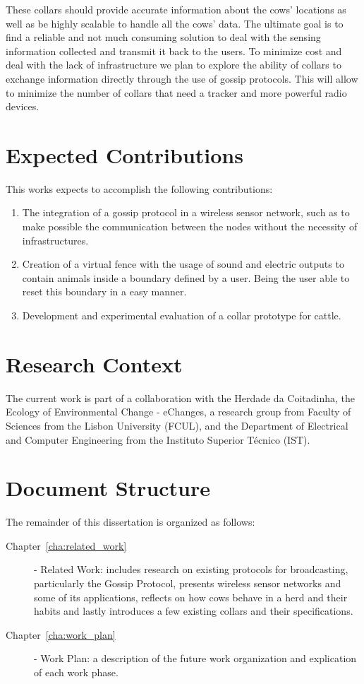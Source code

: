 These collars should provide accurate information about the cows' locations as well as be
highly scalable to handle all the cows' data. The ultimate goal is to find a reliable and
not much consuming solution to deal with the sensing information collected and transmit it
back to the users. To minimize cost and deal with the lack of infrastructure we plan to explore
the ability of collars to exchange information directly through the use of gossip protocols.
This will allow to minimize the number of collars that need a  tracker and
more powerful radio devices.

\section{Expected Contributions}
\label{sec:expected_contributions}
This works expects to accomplish the following contributions:
\begin{enumerate}
      \item The integration of a gossip protocol in a wireless sensor network, such as to make
            possible the communication between the nodes without the necessity of infrastructures.
      \item Creation of a virtual fence with the usage of sound and electric outputs to contain
            animals inside a boundary defined by a user. Being the user able to reset this
            boundary in a easy manner.
      \item Development and experimental evaluation of a collar prototype for cattle.
\end{enumerate}

\section{Research Context}
\label{sec:research_context}
The current work is part of a collaboration with the Herdade da Coitadinha, the Ecology of
Environmental Change - eChanges, a research group from Faculty of Sciences from the Lisbon
University (FCUL), and the Department of Electrical and Computer Engineering from the Instituto
Superior Técnico (IST).

\section{Document Structure}
\label{sec:structure}
The remainder of this dissertation is organized as follows:
\begin{description}
      \item[Chapter~\ref{cha:related_work}] - Related Work: includes research on existing
            protocols for broadcasting, particularly the Gossip Protocol, presents wireless
            sensor networks and some of its applications, reflects on how cows behave in a
            herd and their habits and lastly introduces a few existing collars and their
            specifications.
      \item[Chapter~\ref{cha:work_plan}] - Work Plan: a description of the future work
            organization and explication of each work phase.
\end{description}
